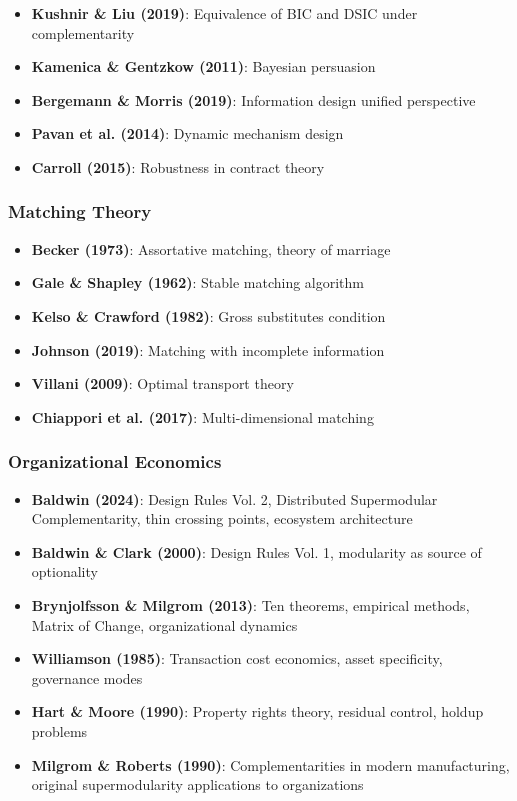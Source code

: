 \begin{itemize}
    \item \textbf{Kushnir \& Liu (2019)}: Equivalence of BIC and DSIC under 
    complementarity
    \item \textbf{Kamenica \& Gentzkow (2011)}: Bayesian persuasion
    \item \textbf{Bergemann \& Morris (2019)}: Information design unified 
    perspective
    \item \textbf{Pavan et al. (2014)}: Dynamic mechanism design
    \item \textbf{Carroll (2015)}: Robustness in contract theory
\end{itemize}

\subsubsection{Matching Theory}

\begin{itemize}
    \item \textbf{Becker (1973)}: Assortative matching, theory of marriage
    \item \textbf{Gale \& Shapley (1962)}: Stable matching algorithm
    \item \textbf{Kelso \& Crawford (1982)}: Gross substitutes condition
    \item \textbf{Johnson (2019)}: Matching with incomplete information
    \item \textbf{Villani (2009)}: Optimal transport theory
    \item \textbf{Chiappori et al. (2017)}: Multi-dimensional matching
\end{itemize}


\subsubsection{Organizational Economics}

\begin{itemize}
    \item \textbf{Baldwin (2024)}: Design Rules Vol. 2, Distributed Supermodular 
    Complementarity, thin crossing points, ecosystem architecture
    \item \textbf{Baldwin \& Clark (2000)}: Design Rules Vol. 1, modularity as 
    source of optionality
    \item \textbf{Brynjolfsson \& Milgrom (2013)}: Ten theorems, empirical methods, 
    Matrix of Change, organizational dynamics
    \item \textbf{Williamson (1985)}: Transaction cost economics, asset specificity, 
    governance modes
    \item \textbf{Hart \& Moore (1990)}: Property rights theory, residual control, 
    holdup problems
    \item \textbf{Milgrom \& Roberts (1990)}: Complementarities in modern manufacturing, 
    original supermodularity applications to organizations
\end{itemize}

